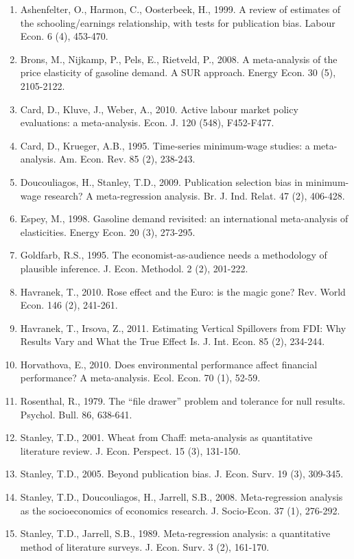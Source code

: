 \begin{enumerate}
\item[]Ashenfelter, O., Harmon, C., Oosterbeek, H., 1999. A review of estimates of the schooling/earnings relationship, with tests for publication bias. Labour Econ. 6 (4), 453-470.
\item[]Brons, M., Nijkamp, P., Pels, E., Rietveld, P., 2008. A meta-analysis of the price elasticity of gasoline demand. A SUR approach. Energy Econ. 30 (5), 2105-2122.
\item[]Card, D., Kluve, J., Weber, A., 2010. Active labour market policy evaluations: a meta-analysis. Econ. J. 120 (548), F452-F477.
\item[]Card, D., Krueger, A.B., 1995. Time-series minimum-wage studies: a meta-analysis. Am. Econ. Rev. 85 (2), 238-243.
\item[]Doucouliagos, H., Stanley, T.D., 2009. Publication selection bias in minimum-wage research? A meta-regression analysis. Br. J. Ind. Relat. 47 (2), 406-428.
\item[]Espey, M., 1998. Gasoline demand revisited: an international meta-analysis of elasticities. Energy Econ. 20 (3), 273-295.
\item[]Goldfarb, R.S., 1995. The economist-as-audience needs a methodology of plausible inference. J. Econ. Methodol. 2 (2), 201-222.
\item[]Havranek, T., 2010. Rose effect and the Euro: is the magic gone? Rev. World Econ. 146 (2), 241-261.
\item[]Havranek, T., Irsova, Z., 2011. Estimating Vertical Spillovers from FDI: Why Results Vary and What the True Effect Is. J. Int. Econ. 85 (2), 234-244.
\item[]Horvathova, E., 2010. Does environmental performance affect financial performance? A meta-analysis. Ecol. Econ. 70 (1), 52-59.
\item[]Rosenthal, R., 1979. The ``file drawer'' problem and tolerance for null results. Psychol. Bull. 86, 638-641.
\item[]Stanley, T.D., 2001. Wheat from Chaff: meta-analysis as quantitative literature review. J. Econ. Perspect. 15 (3), 131-150.
\item[]Stanley, T.D., 2005. Beyond publication bias. J. Econ. Surv. 19 (3), 309-345.
\item[]Stanley, T.D., Doucouliagos, H., Jarrell, S.B., 2008. Meta-regression analysis as the socioeconomics of economics research. J. Socio-Econ. 37 (1), 276-292.
\item[]Stanley, T.D., Jarrell, S.B., 1989. Meta-regression analysis: a quantitative method of literature surveys. J. Econ. Surv. 3 (2), 161-170.
\end{enumerate}


